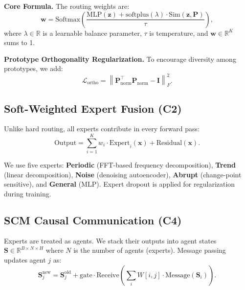 \textbf{Core Formula.} The routing weights are:
\begin{equation}
\label{eq:weight}
\mathbf{w} = \text{Softmax}\left( \frac{\text{MLP}(\mathbf{z}) + \text{softplus}(\lambda) \cdot \text{Sim}(\mathbf{z}, \mathbf{P})}{\tau} \right),
\end{equation}
where $\lambda \in \mathbb{R}$ is a learnable balance parameter, $\tau$ is temperature, and $\mathbf{w} \in \mathbb{R}^K$ sums to 1.

\textbf{Prototype Orthogonality Regularization.} To encourage diversity among prototypes, we add:
\begin{equation}
\label{eq:ortho}
\mathcal{L}_{\text{ortho}} = \left\| \mathbf{P}_{\text{norm}}^\top \mathbf{P}_{\text{norm}} - \mathbf{I} \right\|_F^2.
\end{equation}

\subsection{Soft-Weighted Expert Fusion (C2)}
\label{sec:fusion}

Unlike hard routing, all experts contribute in every forward pass:
\begin{equation}
\label{eq:fusion}
\text{Output} = \sum_{i=1}^{K} w_i \cdot \text{Expert}_i(\mathbf{x}) + \text{Residual}(\mathbf{x}).
\end{equation}

We use five experts: \textbf{Periodic} (FFT-based frequency decomposition), \textbf{Trend} (linear decomposition), \textbf{Noise} (denoising autoencoder), \textbf{Abrupt} (change-point sensitive), and \textbf{General} (MLP). Expert dropout is applied for regularization during training.

\subsection{SCM Causal Communication (C4)}
\label{sec:causal}

Experts are treated as agents. We stack their outputs into agent states $\mathbf{S} \in \mathbb{R}^{B \times N \times H}$ where $N$ is the number of agents (experts). Message passing updates agent $j$ as:
\begin{equation}
\label{eq:message}
\mathbf{S}_j^{\text{new}} = \mathbf{S}_j^{\text{old}} + \text{gate} \cdot \text{Receive}\left( \sum_{i} W[i,j] \cdot \text{Message}(\mathbf{S}_i) \right).
\end{equation}

